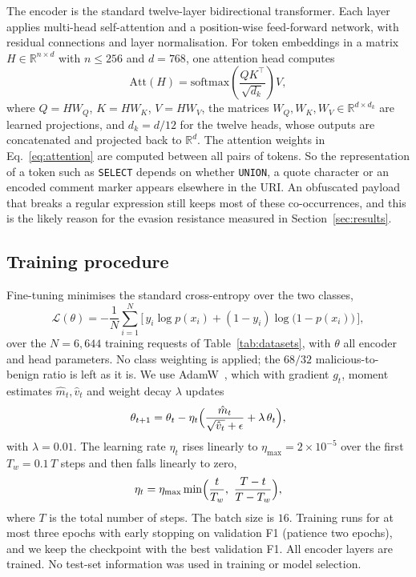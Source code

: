 \documentclass[preprint,11pt]{elsarticle}
\begin{document}
The encoder is the standard twelve-layer bidirectional transformer. Each
layer applies multi-head self-attention and a position-wise feed-forward
network, with residual connections and layer normalisation. For token
embeddings in a matrix $H\in\mathbb{R}^{n\times d}$ with $n\le 256$ and
$d=768$, one attention head computes
\begin{equation}
\mathrm{Att}(H) = \mathrm{softmax}\!\left(\frac{QK^\top}{\sqrt{d_k}}\right)V,
\label{eq:attention}
\end{equation}
where $Q = HW_Q$, $K = HW_K$, $V = HW_V$, the matrices
$W_Q,W_K,W_V\in\mathbb{R}^{d\times d_k}$ are learned projections, and
$d_k = d/12$ for the twelve heads, whose outputs are concatenated and
projected back to $\mathbb{R}^{d}$. The attention weights in
Eq.~\eqref{eq:attention} are computed between all pairs of tokens. So the
representation of a token such as \texttt{SELECT} depends on whether
\texttt{UNION}, a quote character or an encoded comment marker appears
elsewhere in the URI. An obfuscated payload that breaks a regular
expression still keeps most of these co-occurrences, and this is the likely
reason for the evasion resistance measured in Section~\ref{sec:results}.

\subsection{Training procedure}
Fine-tuning minimises the standard cross-entropy over the two classes,
\begin{equation}
\mathcal{L}(\theta) = -\frac{1}{N}\sum_{i=1}^{N}
\big[\, y_i \log p(x_i) + (1-y_i)\log\bigl(1-p(x_i)\bigr) \,\big],
\label{eq:loss}
\end{equation}
over the $N=6{,}644$ training requests of Table~\ref{tab:datasets}, with
$\theta$ all encoder and head parameters. No class weighting is applied;
the $68/32$ malicious-to-benign ratio is left as it is. We use
AdamW~\cite{loshchilov2019adamw}, which with gradient $g_t$, moment
estimates $\hat m_t,\hat v_t$ and weight decay $\lambda$ updates
\begin{equation}
\theta_{t+1}=\theta_t-\eta_t\Bigl(\frac{\hat m_t}{\sqrt{\hat v_t}+\epsilon}+\lambda\,\theta_t\Bigr),
\label{eq:adamw}
\end{equation}
with $\lambda=0.01$. The learning rate $\eta_t$ rises linearly to
$\eta_{\max}=2\times10^{-5}$ over the first $T_w=0.1\,T$ steps and then
falls linearly to zero,
\begin{equation}
\eta_t=\eta_{\max}\min\Bigl(\frac{t}{T_w},\ \frac{T-t}{T-T_w}\Bigr),
\label{eq:lr}
\end{equation}
where $T$ is the total number of steps. The batch size is $16$. Training
runs for at most three epochs with early stopping on validation F1
(patience two epochs), and we keep the checkpoint with the best validation
F1. All encoder layers are trained. No test-set information was used in
training or model selection.
\end{document}

